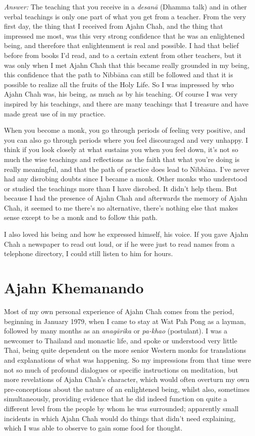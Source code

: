 \emph{Answer:} The teaching that you receive in a \emph{desanā} (Dhamma
talk) and in other verbal teachings is only one part of what you get
from a teacher. From the very first day, the thing that I received from
Ajahn Chah, and the thing that impressed me most, was this very strong
confidence that he was an enlightened being, and therefore that
enlightenment is real and possible. I had that belief before from books
I'd read, and to a certain extent from other teachers, but it was only
when I met Ajahn Chah that this became really grounded in my being, this
confidence that the path to Nibbāna can still be followed and that it is
possible to realize all the fruits of the Holy Life. So I was impressed
by who Ajahn Chah was, his being, as much as by his teaching. Of course
I was very inspired by his teachings, and there are many teachings that
I treasure and have made great use of in my practice. 

When you become a monk, you go through periods of feeling very positive, 
and you can also go through periods where you feel discouraged and very
unhappy. I think if you look closely at what sustains you when you feel
down, it's not so much the wise teachings and reflections as the faith
that what you're doing is really meaningful, and that the path of
practice does lead to Nibbāna. I've never had any disrobing doubts since
I became a monk. Other monks who understood or studied the teachings
more than I have disrobed. It didn't help them. But because I had the
presence of Ajahn Chah and afterwards the memory of Ajahn Chah, it
seemed to me there's no alternative, there's nothing else that makes
sense except to be a monk and to follow this path. 

I also loved his being and how he expressed himself, his voice. If you
gave Ajahn Chah a newspaper to read out loud, or if he were just to read
names from a telephone directory, I could still listen to him for hours. 

\section{Ajahn Khemanando}

Most of my own personal experience of Ajahn Chah comes from the period, 
beginning in January 1979, when I came to stay at Wat Pah Pong as a
layman, followed by many months as an \emph{anagārika} or \emph{pa-khao}
 (postulant). I was a newcomer to Thailand and monastic life, and spoke
or understood very little Thai, being quite dependent on the more senior
Western monks for translations and explanations of what was happening. 
So my impressions from that time were not so much of profound dialogues
or specific instructions on meditation, but more revelations of Ajahn
Chah's character, which would often overturn my own pre-conceptions
about the nature of an enlightened being, whilst also, sometimes
simultaneously, providing evidence that he did indeed function on quite
a different level from the people by whom he was surrounded; apparently
small incidents in which Ajahn Chah would do things that didn't need
explaining, which I was able to observe to gain some food for thought. 

